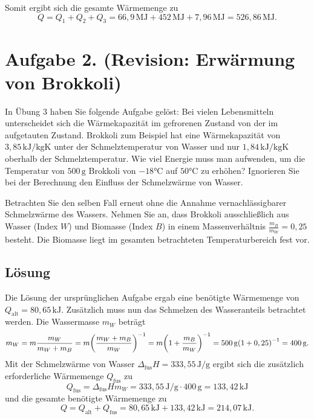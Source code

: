 \documentclass[german,12pt]{homework}
\DeclarePairedDelimiter{\enbrace}{(}{)}
\newcommand{\sis}[1]{\,\si{#1}}
\newcommand{\degC}{\si{\degreeCelsius}}
\begin{document}
    Somit ergibt sich die gesamte Wärmemenge zu
    \[Q = Q_1 + Q_2 + Q_3 = 66,9\sis{\mega\joule} + 452\sis{\mega\joule} +
    7,96\sis{\mega\joule} = 526,86\sis{\mega\joule}.\]

    \section*{Aufgabe 2. (Revision: Erwärmung von Brokkoli)}

    \begin{problem}
        In Übung 3 haben Sie folgende Aufgabe gelöst: Bei vielen Lebensmitteln
        unterscheidet sich die Wärmekapazität im gefrorenen Zustand von der im
        aufgetauten Zustand. Brokkoli zum Beispiel hat eine Wärmekapazität von
        \(3,85\sis{\kilo\joule\per\kg\kelvin}\) unter der Schmelztemperatur
        von Wasser und nur \(1,84\sis{\kilo\joule\per\kg\kelvin}\) oberhalb
        der Schmelztemperatur. Wie viel Energie muss man aufwenden, um die
        Temperatur von \(500\sis{\gram}\) Brokkoli von \(-18\degC\)
        auf \(50\degC\) zu erhöhen? Ignorieren Sie bei der
        Berechnung den Einfluss der Schmelzwärme von Wasser.

        Betrachten Sie den selben Fall erneut ohne die Annahme
        vernachlässigbarer Schmelzwärme des Wassers. Nehmen Sie an, dass
        Brokkoli ausschließlich aus Wasser (Index \(W\)) und Biomasse (Index
        \(B\)) in einem Massenverhältnis \(\frac{m_B}{m_W} = 0,25\) besteht.
        Die Biomasse liegt im gesamten betrachteten Temperaturbereich fest vor.
    \end{problem}

    \subsection*{Lösung} Die Lösung der ursprünglichen Aufgabe ergab eine
    benötigte Wärmemenge von \(Q_\text{alt} = 80,65\sis{\kilo\joule}\).
    Zusätzlich muss nun das Schmelzen des Wasseranteils betrachtet werden. Die
    Wassermasse \(m_W\) beträgt
    \[m_W = m\frac{m_W}{m_W + m_B} = m\enbrace*{\frac{m_W + m_B}{m_W}}^{-1} =
    m\enbrace*{1 + \frac{m_B}{m_W}}^{-1} = 500\sis{\gram}\enbrace*{1 + 0,25}^{-1}
    = 400\sis{\gram}.\]
    Mit der Schmelzwärme von Wasser \(\Delta_\text{fus}H =
    333,55\sis{\joule\per\gram}\) ergibt sich die zusätzlich erforderliche
    Wärmemenge \(Q_\text{fus}\) zu
    \[Q_\text{fus} = \Delta_\text{fus}Hm_W = 333,55\sis{\joule\per\gram} \cdot
    400\sis{\gram} = 133,42\sis{\kilo\joule}\]
    und die gesamte benötigte Wärmemenge zu
    \[Q = Q_\text{alt} + Q_\text{fus} = 80,65\sis{\kilo\joule} +
    133,42\sis{\kilo\joule} = 214,07\sis{\kilo\joule}.\]
\end{document}

